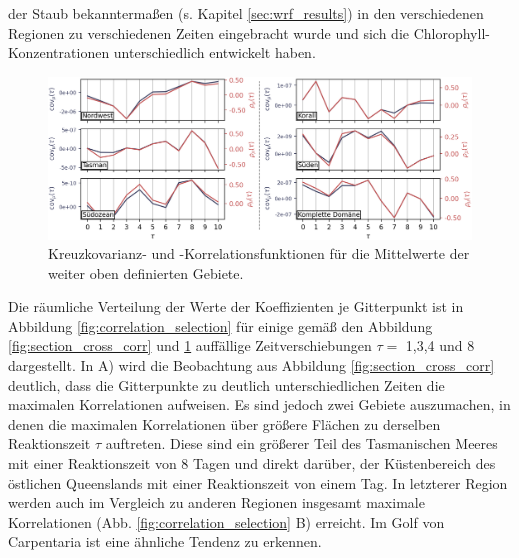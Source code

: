 \documentclass[12pt,a4paper,onecolumn]{scrartcl}
\begin{document}
der Staub bekanntermaßen (s. Kapitel \ref{sec:wrf_results}) in den verschiedenen Regionen zu verschiedenen Zeiten eingebracht wurde und sich die Chlorophyll-Konzentrationen unterschiedlich entwickelt haben.
\begin{figure}[!htb]
\includegraphics[width=\textwidth]{bilder/section_means_crosscorr_noadv.png}
\caption{Kreuzkovarianz- und -Korrelationsfunktionen für die Mittelwerte der weiter oben definierten Gebiete.} \label{fig:section_means_cross_corr}
\end{figure}
Die räumliche Verteilung der Werte der Koeffizienten je Gitterpunkt ist in Abbildung \ref{fig:correlation_selection} für einige gemäß den Abbildung \ref{fig:section_cross_corr} und \ref{fig:section_means_cross_corr} auffällige Zeitverschiebungen $\tau=$ 1,3,4 und 8 dargestellt. In A) wird die Beobachtung aus Abbildung \ref{fig:section_cross_corr} deutlich, dass die Gitterpunkte zu deutlich unterschiedlichen Zeiten die maximalen Korrelationen aufweisen. Es sind jedoch zwei Gebiete auszumachen, in denen die maximalen Korrelationen über größere Flächen zu derselben Reaktionszeit $\tau$ auftreten. Diese sind ein größerer Teil des Tasmanischen Meeres mit einer Reaktionszeit von 8 Tagen und direkt darüber, der Küstenbereich des östlichen Queenslands mit einer Reaktionszeit von einem Tag. In letzterer Region werden auch im Vergleich zu anderen Regionen insgesamt maximale Korrelationen (Abb. \ref{fig:correlation_selection} B) erreicht. Im Golf von Carpentaria ist eine ähnliche Tendenz zu erkennen. 
\end{document}
